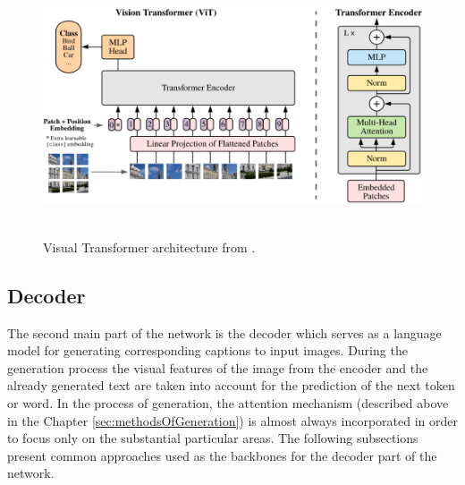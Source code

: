 \begin{figure}[h]\centering
\includegraphics[width=145mm, height=76mm]{../img/VisualTransformerArchitecture}
\caption{Visual Transformer architecture from \citet{dosovitskiy2020image}.}
\label{fig02:ViT}
\end{figure}

\subsection{Decoder}
The second main part of the network is the decoder which serves as a language model for generating corresponding captions to input images. During the generation process the visual features of the image from the encoder and the already generated text are taken into account for the prediction of the next token or word. In the process of generation, the attention mechanism (described above in the Chapter \ref{sec:methodsOfGeneration}) is almost always incorporated in order to focus only on the substantial particular areas. The following subsections present common approaches used as the backbones for the decoder part of the network.
